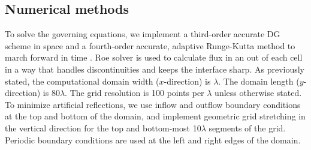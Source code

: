 \subsection{Numerical methods}%
\label{subsec:numerical_methods}%
To solve the governing equations, we implement a third-order accurate
\ac{DG} scheme in space and a fourth-order accurate, adaptive
Runge-Kutta method to march forward in time
\citep{HenrydeFrahan2015}. Roe solver is used to calculate flux in an
out of each cell in a way that handles discontinuities and keeps the
interface sharp. As previously stated, the computational domain width
($x$-direction) is $\lambda$. The domain length ($y$-direction) is
80$\lambda$. The grid resolution is 100 points per $\lambda$ unless
otherwise stated. To minimize artificial reflections, we use inflow
and outflow boundary conditions at the top and bottom of the domain,
and implement geometric grid stretching in the vertical direction for
the top and bottom-most 10$\lambda$ segments of the grid. Periodic
boundary conditions are used at the left and right edges of the
domain.

